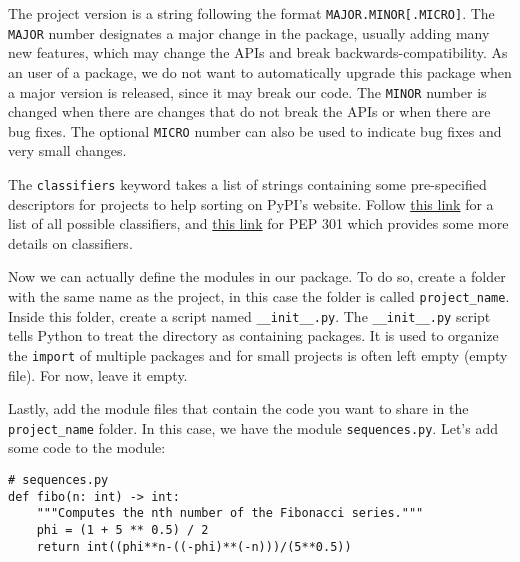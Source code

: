 \documentclass[12pt, a4paper]{article}
\begin{document}
The project version is a string following the format \texttt{MAJOR.MINOR[.MICRO]}. The \texttt{MAJOR} number designates a major change in the package, usually adding many new features, which may change the APIs and break backwards-compatibility.
As an user of a package, we do not want to automatically upgrade this package when a major version is released, since it may break our code.
The \texttt{MINOR} number is changed when there are changes that do not break the APIs or when there are bug fixes.
The optional \texttt{MICRO} number can also be used to indicate bug fixes and very small changes.

The \texttt{classifiers} keyword takes a list of strings containing some pre-specified descriptors for projects to help sorting on PyPI's website.
Follow \href{https://pypi.org/classifiers/}{this link} for a list of all possible classifiers, and \href{https://www.python.org/dev/peps/pep-0301/\#distutils-trove-classification}{this link} for PEP 301 which provides some more details on classifiers.

Now we can actually define the modules in our package.
To do so, create a folder with the same name as the project, in this case the folder is called \texttt{project\_name}.
Inside this folder, create a script named \texttt{\_\_init\_\_.py}.
The \texttt{\_\_init\_\_.py} script tells Python to treat the directory as containing packages.
It is used to organize the \texttt{import} of multiple packages and for small projects is often left empty (empty file).
For now, leave it empty.

Lastly, add the module files that contain the code you want to share in the \texttt{project\_name} folder. In this case, we have the module \texttt{sequences.py}.
Let's add some code to the module:
\lstset{language=jupyter-python,label= ,caption= ,captionpos=b,numbers=none}
\begin{lstlisting}
# sequences.py
def fibo(n: int) -> int:
    """Computes the nth number of the Fibonacci series."""
    phi = (1 + 5 ** 0.5) / 2
    return int((phi**n-((-phi)**(-n)))/(5**0.5))
\end{lstlisting}
\end{document}
